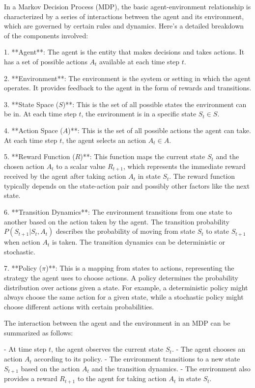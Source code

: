 In a Markov Decision Process (MDP), the basic agent-environment relationship is characterized by a series of interactions between the agent and its environment, which are governed by certain rules and dynamics. Here's a detailed breakdown of the components involved:

1. **Agent**: The agent is the entity that makes decisions and takes actions. It has a set of possible actions \( A_t \) available at each time step \( t \).

2. **Environment**: The environment is the system or setting in which the agent operates. It provides feedback to the agent in the form of rewards and transitions.

3. **State Space (\( S \))**: This is the set of all possible states the environment can be in. At each time step \( t \), the environment is in a specific state \( S_t \in S \).

4. **Action Space (\( A \))**: This is the set of all possible actions the agent can take. At each time step \( t \), the agent selects an action \( A_t \in A \).

5. **Reward Function (\( R \))**: This function maps the current state \( S_t \) and the chosen action \( A_t \) to a scalar value \( R_{t+1} \), which represents the immediate reward received by the agent after taking action \( A_t \) in state \( S_t \). The reward function typically depends on the state-action pair and possibly other factors like the next state.

6. **Transition Dynamics**: The environment transitions from one state to another based on the action taken by the agent. The transition probability \( P(S_{t+1} | S_t, A_t) \) describes the probability of moving from state \( S_t \) to state \( S_{t+1} \) when action \( A_t \) is taken. The transition dynamics can be deterministic or stochastic.

7. **Policy (\( \pi \))**: This is a mapping from states to actions, representing the strategy the agent uses to choose actions. A policy determines the probability distribution over actions given a state. For example, a deterministic policy might always choose the same action for a given state, while a stochastic policy might choose different actions with certain probabilities.

The interaction between the agent and the environment in an MDP can be summarized as follows:

- At time step \( t \), the agent observes the current state \( S_t \).
- The agent chooses an action \( A_t \) according to its policy.
- The environment transitions to a new state \( S_{t+1} \) based on the action \( A_t \) and the transition dynamics.
- The environment also provides a reward \( R_{t+1} \) to the agent for taking action \( A_t \) in state \( S_t \).

